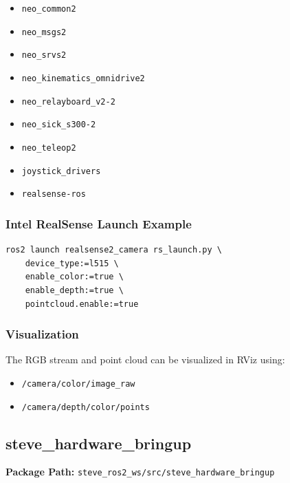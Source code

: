 \documentclass[12pt,oneside,a4paper]{article}
\begin{document}
\begin{itemize}
    \item \texttt{neo\_common2}
    \item \texttt{neo\_msgs2}
    \item \texttt{neo\_srvs2}
    \item \texttt{neo\_kinematics\_omnidrive2}
    \item \texttt{neo\_relayboard\_v2-2}
    \item \texttt{neo\_sick\_s300-2}
    \item \texttt{neo\_teleop2}
    \item \texttt{joystick\_drivers}
    \item \texttt{realsense-ros}
\end{itemize}

\subsubsection{Intel RealSense Launch Example}

\begin{lstlisting}[style=bashstyle]
ros2 launch realsense2_camera rs_launch.py \
    device_type:=l515 \
    enable_color:=true \
    enable_depth:=true \
    pointcloud.enable:=true
\end{lstlisting}

\subsubsection{Visualization}

The RGB stream and point cloud can be visualized in RViz using:

\begin{itemize}
    \item \texttt{/camera/color/image\_raw}
    \item \texttt{/camera/depth/color/points}
\end{itemize}

\subsection{steve\_hardware\_bringup}
\label{subsec:steve_hardware_bringup}

\textbf{Package Path:} \texttt{steve\_ros2\_ws/src/steve\_hardware\_bringup}
\end{document}
